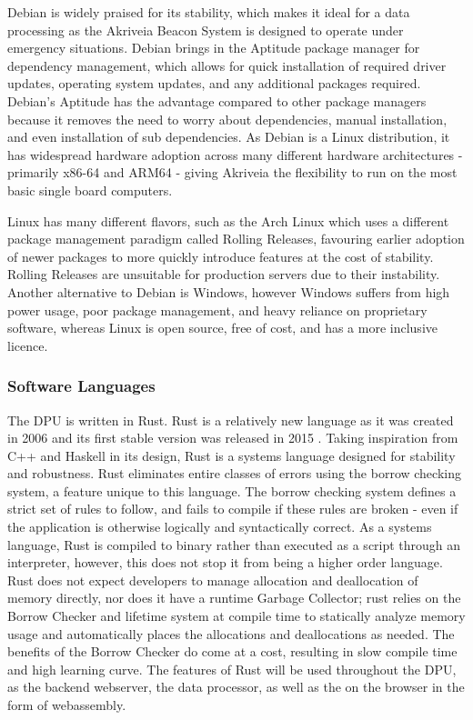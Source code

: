\bigskip
Debian is widely praised for its stability, which makes it ideal for a data processing as the Akriveia Beacon System is designed to operate under emergency situations. Debian brings in the \Gls{Aptitude} package manager for dependency management, which allows for quick installation of required driver updates, operating system updates, and any additional packages required.
Debian's Aptitude has the advantage compared to other package managers because it removes the need to worry about dependencies, manual installation, and even installation of sub dependencies.
As Debian is a Linux distribution, it has widespread hardware adoption across many different hardware architectures - primarily \Gls{x86-64} and \Gls{ARM64} - giving Akriveia the flexibility to run on the most basic single board computers.

\bigskip
Linux has many different flavors, such as the Arch Linux which uses a different package management paradigm called \Gls{Rolling Releases}, favouring earlier adoption of newer packages to more quickly introduce features at the cost of stability.
\Gls{Rolling Releases} are unsuitable for production servers due to their instability.
Another alternative to Debian is Windows, however Windows suffers from high power usage, poor package management, and heavy reliance on proprietary software, whereas Linux is open source, free of cost, and has a more inclusive licence.

\pagebreak
\subsubsection{Software Languages}
\medskip
The DPU is written in \Gls{Rust}.
Rust is a relatively new language as it was created in 2006 \cite{rust_graydon_interview} and its first stable version was released in 2015 \cite{rust_releases}.
Taking inspiration from C++ and Haskell in its design, Rust is a systems language designed for stability and robustness. Rust eliminates entire classes of errors using the borrow checking system, a feature unique to this language.
The borrow checking system defines a strict set of rules to follow, and fails to compile if these rules are broken - even if the application is otherwise logically and syntactically correct.
As a systems language, Rust is compiled to binary rather than executed as a script through an interpreter, however, this does not stop it from being a higher order language.
Rust does not expect developers to manage allocation and deallocation of memory directly, nor does it have a runtime \Gls{Garbage Collector}; rust relies on the \Gls{Borrow Checker} and lifetime system at compile time to statically analyze memory usage and automatically places the allocations and deallocations as needed. The benefits of the \Gls{Borrow Checker} do come at a cost, resulting in slow compile time and high learning curve. The features of Rust will be used throughout the DPU, as the backend webserver, the data processor, as well as the on the browser in the form of webassembly. 

